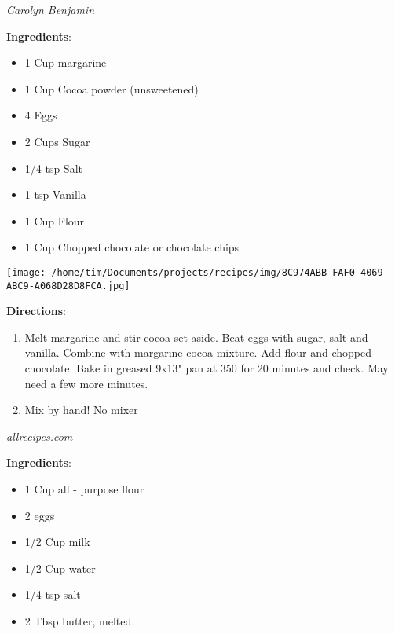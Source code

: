 \documentclass[11pt, twoside, openany]{book}
\begin{document}
 \label{dark-chocolate-brownies}\hfill\textit{Carolyn Benjamin}\\
\begin{minipage}[t]{0.8\linewidth}
\textbf{Ingredients}:\vspace{-3mm}
\begin{multicols}{2}
\begin{itemize}\setlength\itemsep{-1mm}
\item 1 Cup margarine
\item 1 Cup Cocoa powder (unsweetened)
\item 4 Eggs
\item 2 Cups Sugar
\item 1/4 tsp Salt
\item 1 tsp Vanilla
\item 1 Cup Flour
\item 1 Cup Chopped chocolate or chocolate chips
\end{itemize}
\end{multicols}
\end{minipage}
\begin{minipage}[t]{0.2\linewidth}
\centering \strut\vspace*{-\baselineskip}\newline
\texttt{[image: /home/tim/Documents/projects/recipes/img/8C974ABB-FAF0-4069-ABC9-A068D28D8FCA.jpg]}\\
\end{minipage}\vspace{3mm}
\textbf{Directions}:
\vspace{-3mm}\begin{enumerate}\setlength\itemsep{-1mm}
\item Melt margarine and stir cocoa-set aside. Beat eggs with sugar, salt and vanilla. Combine with margarine cocoa mixture. Add flour and chopped chocolate. Bake in greased 9x13" pan at 350 for 20 minutes and check. May need a few more minutes.
\item Mix by hand! No mixer
\end{enumerate}
 \label{basic-crepes}\hfill\textit{allrecipes.com}\\
\begin{minipage}[t]{0.8\linewidth}
\textbf{Ingredients}:\vspace{-3mm}
\begin{multicols}{2}
\begin{itemize}\setlength\itemsep{-1mm}
\item 1 Cup all - purpose flour
\item 2 eggs
\item 1/2 Cup milk
\item 1/2 Cup water
\item 1/4 tsp salt
\item 2 Tbsp butter, melted
\end{itemize}
\end{multicols}
\end{minipage}
\end{document}
